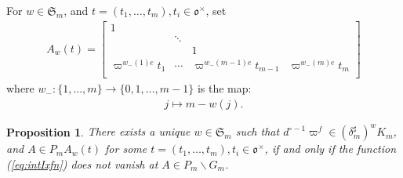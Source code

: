 \documentclass[11pt]{amsart}
\newcommand\Vp{\varpi}%
\newcommand\vp{\varphi}%
\newcommand\oo{\mathfrak{o}}
\newcommand\Sf{{\mathfrak{S}}}
\newcommand\1{\mathbf{1}}
\newcommand\bs{\backslash}%
\newcommand\tm{\times}
\numberwithin{equation}{section}
\newtheorem{prop}[thm]{Proposition}
\begin{document}
For $w \in \Sf_m$, and $t = (t_1, \ldots, t_m), t_i \in \oo^\tm$, set
\begin{align}
A_w(t) = \begin{bmatrix}
1& & &  \\
& \ddots & & \\
& & 1&  \\
\Vp^{w_-(1)e}t_{1} & \cdots & \Vp^{w_-(m-1)e}t_{m-1} & \Vp^{w_-(m)e}t_{m}  \\
\end{bmatrix} \label{def:Awt}
\end{align} 
where $w_-: \{1, \ldots, m\} \to \{0, 1, \ldots,m-1\}$ is the map:  
\begin{align*}
j \longmapsto m-w(j).
\end{align*} 
\begin{prop}\label{prop:Aform}
There exists a unique $w \in \Sf_m$ such that $d_{}^{\circ -1} \Vp^{f} \in (\delta_m^\sharp)^w K_m$,  and $A \in P_m A_w(t)$ for some $t = (t_1, \ldots, t_m), t_i \in \oo^\tm$, if and only if the function (\ref{eq:intIxfn}) does not vanish at $A \in P_m \bs G_m$.
\end{prop}
\end{document}
